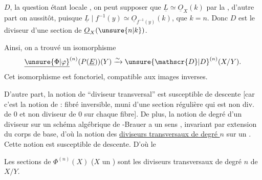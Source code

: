 $D$,  la question étant locale , on peut supposer que $\underline{L}\simeq\underline{O}_X(k)$ par la , d'autre part on  aussitôt, puisque $\underline{L}\mid f^{-1}(y)\simeq\underline{O}_{f^{-1}(y)}(k)$, que $k=n$. Donc $D$ est le diviseur d'une section de $\underline{O}_X(\unsure{n|k})$.

Ainsi, on a  trouvé un isomorphisme 
\[
\underline{\unsure{\Phi|\varphi}}^{(n)}(P(\underline{E}))(Y)\xrightarrow{\sim}\unsure{\mathscr{D}|D}^{(n)}(X/Y).
\]
Cet isomorphisme est fonctoriel, compatible aux images inverses.

D'autre part, la notion de ``diviseur  transversal'' est susceptible de descente [car c'est la notion de : fibré inversible, muni d'une section régulière qui est non div. de $0$ et non diviseur de $0$ sur chaque fibre]. De plus, la notion de degré d'un diviseur sur un schéma algébrique de -Brauer a un sens , invariant par extension du corps de base, d'où la notion des \uline{diviseurs  transversaux de degré $n$} sur un . Cette notion est susceptible de descente. D'où le

\uline{} Les sections de $\Phi^{(n)}(X)$ ($X$ un ) sont les diviseurs  transversaux de degré $n$ de $X/Y$.
